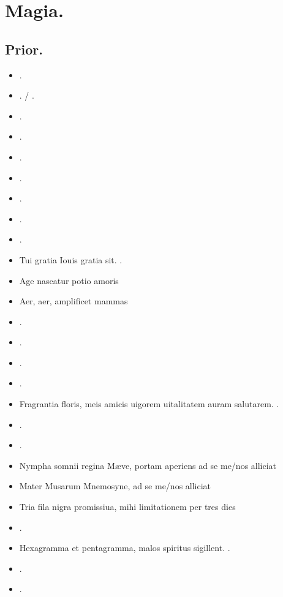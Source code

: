 \documentclass[12pt]{book}
\begin{document}
\chapter{Magia.}\label{magia}
\section{Prior.}\label{prior}

\begin{itemize}
  \item {}.
  \item {}. / .
  \item {}.
  \item {}.
  \item {}.
  \item {}.
  \item {}.
  \item {}.
  \item {}.
  \item Tui gratia Iouis gratia sit. .
  \item Age nascatur potio amoris \textelp{}
  \item Aer, aer, amplificet mammas \textelp{}
  \item {}.
  \item {}.
  \item {}.
  \item {}.
  \item Fragrantia floris, meis amicis uigorem uitalitatem auram salutarem. .
  \item {}.
  \item {}.
  \item Nympha somnii regina Mæve, portam aperiens ad se me/nos alliciat \textelp{}
  \item Mater Musarum Mnemosyne, ad se me/nos alliciat \textelp{}
  \item Tria fila nigra promissiua, mihi limitationem per tres dies \textelp{}
  \item {}.
  \item Hexagramma et pentagramma, malos spiritus sigillent. .
  \item {} \textelp{} .
  \item {}.
\end{itemize}
\end{document}
